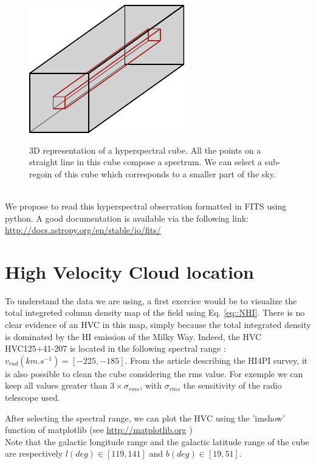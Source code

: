 \documentclass[a4paper,10.5pt]{report}
\begin{document}
\begin{figure}[h!]
  \centering
  \includegraphics[width=3.in]{hyperspectral.pdf}
  \label{fig::hyperspectral}
  \caption{3D representation of a hyperspectral cube. All the points on a straight line in this cube compose a spectrum.
  We can select a sub-regoin of this cube which corresponds to a smaller part of the sky.}
\end{figure} \\

We propose to read this hyperspectral observation formatted in FITS using python.
A good documentation is available via the following link: 
\color{blue} \url{http://docs.astropy.org/en/stable/io/fits/} \color{black}

\section{High Velocity Cloud location}
To understand the data we are using, a first exercice would be to visualize the total integreted column density map of the field 
using Eq. \ref{eq::NHI}. There is no clear evidence of an HVC in this map, simply because the total integrated density is dominated 
by the HI emission of the Milky Way. Indeed, the HVC HVC125+41-207 is located in the following spectral range : $v_{rad} (km.s^{-1}) = [-225, -185]$. 
From the article describing the HI4PI survey, it is also possible to clean the cube considering the rms value. For exemple we can keep 
all values greater than $3 \times \sigma_{rms}$, with $\sigma_{rms}$ the sensitivity of the radio telescope used.


After selecting the spectral range, we can plot the HVC using the 'imshow' function of matplotlib 
(see \color{blue} \url{http://matplotlib.org} \color{black}) \\
Note that the galactic longitude range and the galactic latitude range of the cube are respectively
$l(deg) \in [119, 141]$ and $b(deg) \in [19, 51]$.
\end{document}
